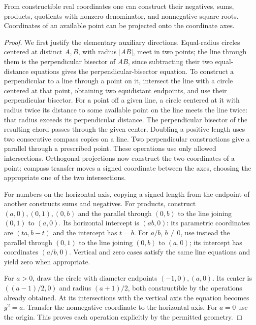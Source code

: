 \begin{lemma}\label{lem:geometric-field-operations}
From constructible real coordinates one can construct their negatives, sums, products, quotients with nonzero denominator, and nonnegative square roots. Coordinates of an available point can be projected onto the coordinate axes.
\end{lemma}
\begin{proof}
We first justify the elementary auxiliary directions. Equal-radius circles centered at distinct $A,B$, with radius $|AB|$, meet in two points; the line through them is the perpendicular bisector of $AB$, since subtracting their two equal-distance equations gives the perpendicular-bisector equation. To construct a perpendicular to a line through a point on it, intersect the line with a circle centered at that point, obtaining two equidistant endpoints, and use their perpendicular bisector. For a point off a given line, a circle centered at it with radius twice its distance to some available point on the line meets the line twice: that radius exceeds its perpendicular distance. The perpendicular bisector of the resulting chord passes through the given center. Doubling a positive length uses two consecutive compass copies on a line. Two perpendicular constructions give a parallel through a prescribed point. These operations use only allowed intersections. Orthogonal projections now construct the two coordinates of a point; compass transfer moves a signed coordinate between the axes, choosing the appropriate one of the two intersections.

For numbers on the horizontal axis, copying a signed length from the endpoint of another constructs sums and negatives. For products, construct $(a,0),(0,1),(0,b)$ and the parallel through $(0,b)$ to the line joining $(0,1)$ to $(a,0)$. Its horizontal intercept is $(ab,0)$: its parametric coordinates are $(ta,b-t)$ and the intercept has $t=b$. For $a/b$, $b\ne0$, use instead the parallel through $(0,1)$ to the line joining $(0,b)$ to $(a,0)$; its intercept has coordinates $(a/b,0)$. Vertical and zero cases satisfy the same line equations and yield zero when appropriate.

For $a>0$, draw the circle with diameter endpoints $(-1,0),(a,0)$. Its center is $((a-1)/2,0)$ and radius $(a+1)/2$, both constructible by the operations already obtained. At its intersections with the vertical axis the equation becomes $y^2=a$. Transfer the nonnegative coordinate to the horizontal axis. For $a=0$ use the origin. This proves each operation explicitly by the permitted geometry.
\end{proof}

